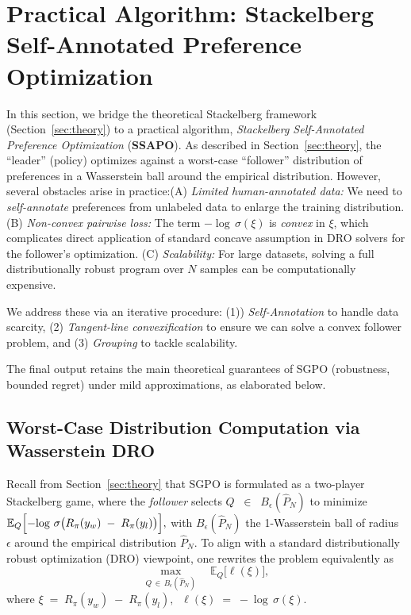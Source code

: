 \section{Practical Algorithm: Stackelberg Self-Annotated Preference Optimization }
\label{sec:ssapo}

In this section, we bridge the theoretical Stackelberg framework (Section~\ref{sec:theory}) to a practical algorithm, \emph{Stackelberg Self-Annotated Preference Optimization} (\textbf{SSAPO}).  As described in Section~\ref{sec:theory}, the “leader” (policy) optimizes against a worst-case “follower” distribution of preferences in a Wasserstein ball around the empirical distribution.  However, several obstacles arise in practice:(A) \emph{Limited human-annotated data:}  We need to \emph{self-annotate} preferences from unlabeled data to enlarge the training distribution.
(B) \emph{Non-convex pairwise loss:} The term $-\!\log\,\sigma(\xi)$ is \emph{convex} in $\xi$, which complicates direct application of standard concave assumption in DRO solvers for the follower’s optimization.
(C) \emph{Scalability:} For large datasets, solving a full distributionally robust program over $N$ samples can be computationally expensive.

We address these via an iterative procedure:  
(1)) \emph{Self-Annotation} to handle data scarcity,  
(2) \emph{Tangent-line convexification} to ensure we can solve a convex follower problem, and 
(3) \emph{Grouping} to tackle scalability. 

The final output retains the main theoretical guarantees of SGPO (robustness, bounded regret) under mild approximations, as elaborated below.

\subsection{Worst-Case Distribution Computation via Wasserstein DRO}
\label{subsec:follower_esfahani}

Recall from Section~\ref{sec:theory} that SGPO is formulated as a 
two-player Stackelberg game, where the \emph{follower} selects 
\(
Q \;\;\in\;\; B_\epsilon(\hat{P}_N)\)
to minimize \(
\mathbb{E}_Q\Bigl[-\!\log\,\sigma\bigl(R_{\pi}(y_w) \;-\; R_{\pi}(y_l)\bigr)\Bigr],
\)
with $B_\epsilon(\hat{P}_N)$ the 1-Wasserstein ball of radius $\epsilon$ 
around the empirical distribution $\hat{P}_N$.  
To align with a standard distributionally robust optimization (DRO) viewpoint, 
one rewrites the problem equivalently as
\begin{equation}
\label{eq:negative_logloss}
\max_{Q \,\in\, B_\epsilon(\hat{P}_N)}
\quad
\mathbb{E}_Q\bigl[\ell(\xi)\bigr],
\end{equation}
where
\(\xi 
\;=\;
R_{\pi}(y_w)\;-\;R_{\pi}(y_l),
\;\;
\ell(\xi)
\;=\;
-\!\log\,\sigma(\xi).
\)


